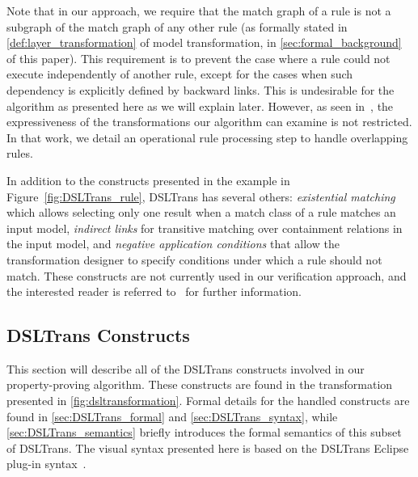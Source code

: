 Note that in our approach, we require that the match graph of a rule is not a subgraph of the match graph of any other rule (as formally stated in \cref{def:layer_transformation} of model transformation, in \cref{sec:formal_background} of this paper). This requirement is to prevent the case where a rule could not execute independently of another rule, except for the cases when such dependency is explicitly defined by backward links. This is undesirable for the algorithm as presented here as we will explain later. However, as seen in~\cite{conf/gg/SelimLCDO14}, the expressiveness of the transformations our algorithm can examine   is not restricted. In that work, we detail an operational rule processing step to handle overlapping rules.


In addition to the constructs presented in the example in
Figure~\ref{fig:DSLTrans_rule}, DSLTrans has several others:
\emph{existential matching} which allows selecting only one result when a match class of a rule
matches an input model, \emph{indirect links} for transitive matching
over containment relations in the input model, and \emph{negative application
conditions} that allow the transformation designer to specify conditions under
which a rule should not match. These constructs are not currently used in
our verification approach, and the interested reader is referred to~\cite{Barroca2011} for further information.

\subsection{DSLTrans Constructs}
\label{subsec:DSLTrans_constructs}
This section will describe all of the DSLTrans constructs involved in our
property-proving algorithm. These constructs are found in the transformation presented in \cref{fig:dsltransformation}. Formal details for the handled constructs are found in \cref{sec:DSLTrans_formal} and \cref{sec:DSLTrans_syntax}, while \cref{sec:DSLTrans_semantics} briefly introduces the formal semantics of this subset of DSLTrans. The visual syntax presented here is based on the DSLTrans Eclipse plug-in syntax~\cite{dsltrans_manual}.

